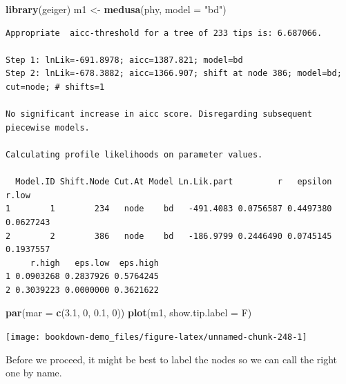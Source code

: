 \documentclass[
]{book}
\newenvironment{Shaded}{\begin{snugshade}}{\end{snugshade}}
\newcommand{\DataTypeTok}[1]{\textcolor[rgb]{0.13,0.29,0.53}{#1}}
\newcommand{\DecValTok}[1]{\textcolor[rgb]{0.00,0.00,0.81}{#1}}
\newcommand{\FloatTok}[1]{\textcolor[rgb]{0.00,0.00,0.81}{#1}}
\newcommand{\KeywordTok}[1]{\textcolor[rgb]{0.13,0.29,0.53}{\textbf{#1}}}
\newcommand{\NormalTok}[1]{#1}
\newcommand{\OperatorTok}[1]{\textcolor[rgb]{0.81,0.36,0.00}{\textbf{#1}}}
\newcommand{\StringTok}[1]{\textcolor[rgb]{0.31,0.60,0.02}{#1}}
\begin{document}
\begin{Shaded}
\begin{Highlighting}[]
\KeywordTok{library}\NormalTok{(geiger)}
\NormalTok{m1 \textless{}{-}}\StringTok{ }\KeywordTok{medusa}\NormalTok{(phy, }\DataTypeTok{model =} \StringTok{"bd"}\NormalTok{)}
\end{Highlighting}
\end{Shaded}

\begin{verbatim}
Appropriate  aicc-threshold for a tree of 233 tips is: 6.687066.

Step 1: lnLik=-691.8978; aicc=1387.821; model=bd
Step 2: lnLik=-678.3882; aicc=1366.907; shift at node 386; model=bd; cut=node; # shifts=1

No significant increase in aicc score. Disregarding subsequent piecewise models.

Calculating profile likelihoods on parameter values.

  Model.ID Shift.Node Cut.At Model Ln.Lik.part         r   epsilon     r.low
1        1        234   node    bd   -491.4083 0.0756587 0.4497380 0.0627243
2        2        386   node    bd   -186.9799 0.2446490 0.0745145 0.1937557
     r.high   eps.low  eps.high
1 0.0903268 0.2837926 0.5764245
2 0.3039223 0.0000000 0.3621622
\end{verbatim}

\begin{Shaded}
\begin{Highlighting}[]
\KeywordTok{par}\NormalTok{(}\DataTypeTok{mar =} \KeywordTok{c}\NormalTok{(}\FloatTok{3.1}\NormalTok{, }\DecValTok{0}\NormalTok{, }\FloatTok{0.1}\NormalTok{, }\DecValTok{0}\NormalTok{))}
\KeywordTok{plot}\NormalTok{(m1, }\DataTypeTok{show.tip.label =}\NormalTok{ F)}
\end{Highlighting}
\end{Shaded}

\begin{center}\texttt{[image: bookdown-demo\_files/figure-latex/unnamed-chunk-248-1]} \end{center}

Before we proceed, it might be best to label the nodes so we can call the right one by name.

\begin{Shaded}
\end{Shaded}
\end{document}
